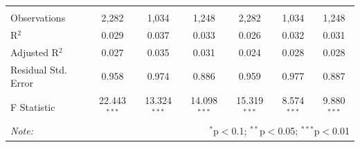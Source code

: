 \documentclass[alpha-refs]{wiley-article-01g}
\begin{document}
\begin{landscape}
\begin{table}[!htbp]
\begin{tabular}{@{\extracolsep{5pt}}lcccccc}
  & & & & & & \\ 
\hline \\[-.8ex] 
Observations & 2,282 & 1,034 & 1,248 & 2,282 & 1,034 & 1,248 \\ 
R$^{2}$ & 0.029 & 0.037 & 0.033 & 0.026 & 0.032 & 0.031 \\ 
Adjusted R$^{2}$ & 0.027 & 0.035 & 0.031 & 0.024 & 0.028 & 0.028 \\ 
Residual Std. Error & 0.958 & 0.974 & 0.886 & 0.959 & 0.977 & 0.887 \\ 
F Statistic & 22.443$^{***}$ & 13.324$^{***}$ & 14.098$^{***}$ & 15.319$^{***}$ & 8.574$^{***}$ & 9.880$^{***}$ \\ 
\hline 
\textit{Note:}  & \multicolumn{6}{r}{$^{*}$p$<$0.1; $^{**}$p$<$0.05; $^{***}$p$<$0.01} \\ 
\end{tabular} 
\end{table} 

\end{landscape}

\newpage
\end{document}
